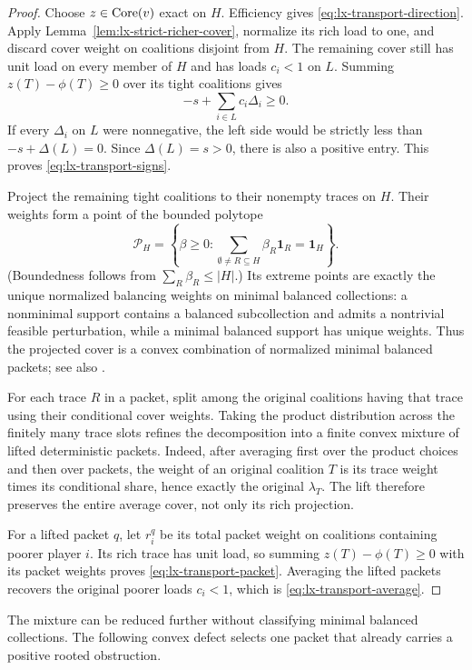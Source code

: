 \begin{proof}
Choose $z\in\operatorname{Core}(v)$ exact on $H$.  Efficiency gives
\eqref{eq:lx-transport-direction}.  Apply
Lemma~\ref{lem:lx-strict-richer-cover}, normalize its rich load to one, and
discard cover weight on coalitions disjoint from $H$.  The remaining cover
still has unit load on every member of $H$ and has loads $c_i<1$ on $L$.
Summing $z(T)-\phi(T)\geq0$ over its tight coalitions gives
\[
 -s+\sum_{i\in L}c_i\Delta_i\geq0.                   \tag{BT-C}
 \label{eq:lx-transport-cover}
\]
If every $\Delta_i$ on $L$ were nonnegative, the left side would be strictly
less than $-s+\Delta(L)=0$.  Since $\Delta(L)=s>0$, there is also a positive
entry.  This proves \eqref{eq:lx-transport-signs}.

Project the remaining tight coalitions to their nonempty traces on $H$.
Their weights form a point of the bounded polytope
\[
 \mathcal P_H=\left\{\beta\geq0:
       \sum_{\emptyset\ne R\subseteq H}\beta_R\mathbf1_R
       =\mathbf1_H\right\}.
\]
(Boundedness follows from $\sum_R\beta_R\leq|H|$.)  Its extreme points are
exactly the unique normalized balancing weights on minimal balanced
collections: a nonminimal support contains a balanced subcollection and
admits a nontrivial feasible perturbation, while a minimal balanced support
has unique weights.  Thus the projected cover is a convex combination of
normalized minimal balanced packets; see also
\citet{LaplaceMermoudEtAl2025}.

For each trace $R$ in a packet, split among the original coalitions having
that trace using their conditional cover weights.  Taking the product
distribution across the finitely many trace slots refines the decomposition
into a finite convex mixture of lifted deterministic packets.  Indeed, after
averaging first over the product choices and then over packets, the weight of
an original coalition $T$ is its trace weight times its conditional share,
hence exactly the original $\lambda_T$.  The lift therefore preserves the
entire average cover, not only its rich projection.

For a lifted packet $q$, let $r_i^q$ be its total packet weight on coalitions
containing poorer player $i$.  Its rich trace has unit load, so summing
$z(T)-\phi(T)\geq0$ with its packet weights proves
\eqref{eq:lx-transport-packet}.  Averaging the lifted packets recovers the
original poorer loads $c_i<1$, which is \eqref{eq:lx-transport-average}.
\end{proof}

The mixture can be reduced further without classifying minimal balanced
collections.  The following convex defect selects one packet that already
carries a positive rooted obstruction.

